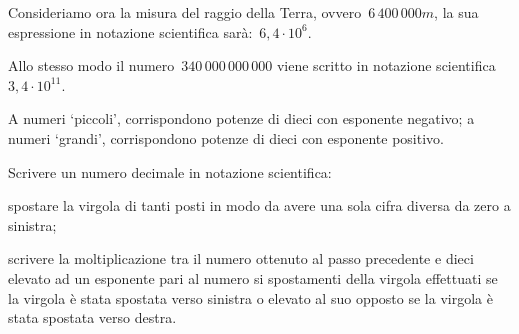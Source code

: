Consideriamo ora la misura del raggio della Terra,
ovvero~\(6\,400\,000\unit{m}\),
la sua espressione in notazione scientifica sarà:~\(6,4\cdot10^6\).

Allo stesso modo il numero~\(340\,000\,000\,000\) viene scritto in notazione
scientifica~\(3,4\cdot10^{11}\).

\osservazione A numeri `piccoli', corrispondono potenze di dieci con
esponente negativo;
a numeri `grandi', corrispondono potenze di dieci con esponente positivo.

\begin{procedura}
Scrivere un numero decimale in notazione scientifica:
\begin{enumeratea} %
 \item spostare la virgola di tanti posti in modo da avere una sola cifra
  diversa da zero a sinistra;
 \item scrivere la moltiplicazione tra il numero ottenuto al passo
precedente
  e dieci elevato ad un esponente pari al numero si spostamenti della
virgola
  effettuati se la virgola è stata spostata verso sinistra o elevato al suo
  opposto se la virgola è stata spostata verso destra.
\end{enumeratea}
\end{procedura}

